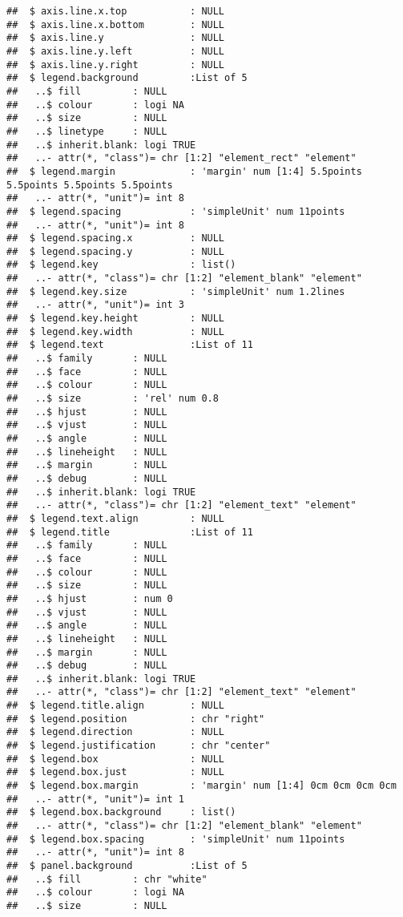 \documentclass[
]{article}
\begin{document}
\begin{verbatim}
##  $ axis.line.x.top           : NULL
##  $ axis.line.x.bottom        : NULL
##  $ axis.line.y               : NULL
##  $ axis.line.y.left          : NULL
##  $ axis.line.y.right         : NULL
##  $ legend.background         :List of 5
##   ..$ fill         : NULL
##   ..$ colour       : logi NA
##   ..$ size         : NULL
##   ..$ linetype     : NULL
##   ..$ inherit.blank: logi TRUE
##   ..- attr(*, "class")= chr [1:2] "element_rect" "element"
##  $ legend.margin             : 'margin' num [1:4] 5.5points 5.5points 5.5points 5.5points
##   ..- attr(*, "unit")= int 8
##  $ legend.spacing            : 'simpleUnit' num 11points
##   ..- attr(*, "unit")= int 8
##  $ legend.spacing.x          : NULL
##  $ legend.spacing.y          : NULL
##  $ legend.key                : list()
##   ..- attr(*, "class")= chr [1:2] "element_blank" "element"
##  $ legend.key.size           : 'simpleUnit' num 1.2lines
##   ..- attr(*, "unit")= int 3
##  $ legend.key.height         : NULL
##  $ legend.key.width          : NULL
##  $ legend.text               :List of 11
##   ..$ family       : NULL
##   ..$ face         : NULL
##   ..$ colour       : NULL
##   ..$ size         : 'rel' num 0.8
##   ..$ hjust        : NULL
##   ..$ vjust        : NULL
##   ..$ angle        : NULL
##   ..$ lineheight   : NULL
##   ..$ margin       : NULL
##   ..$ debug        : NULL
##   ..$ inherit.blank: logi TRUE
##   ..- attr(*, "class")= chr [1:2] "element_text" "element"
##  $ legend.text.align         : NULL
##  $ legend.title              :List of 11
##   ..$ family       : NULL
##   ..$ face         : NULL
##   ..$ colour       : NULL
##   ..$ size         : NULL
##   ..$ hjust        : num 0
##   ..$ vjust        : NULL
##   ..$ angle        : NULL
##   ..$ lineheight   : NULL
##   ..$ margin       : NULL
##   ..$ debug        : NULL
##   ..$ inherit.blank: logi TRUE
##   ..- attr(*, "class")= chr [1:2] "element_text" "element"
##  $ legend.title.align        : NULL
##  $ legend.position           : chr "right"
##  $ legend.direction          : NULL
##  $ legend.justification      : chr "center"
##  $ legend.box                : NULL
##  $ legend.box.just           : NULL
##  $ legend.box.margin         : 'margin' num [1:4] 0cm 0cm 0cm 0cm
##   ..- attr(*, "unit")= int 1
##  $ legend.box.background     : list()
##   ..- attr(*, "class")= chr [1:2] "element_blank" "element"
##  $ legend.box.spacing        : 'simpleUnit' num 11points
##   ..- attr(*, "unit")= int 8
##  $ panel.background          :List of 5
##   ..$ fill         : chr "white"
##   ..$ colour       : logi NA
##   ..$ size         : NULL

\end{verbatim}
\end{document}
